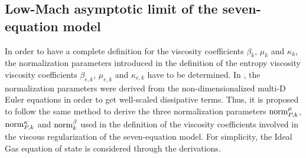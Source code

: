 \subsection{Low-Mach asymptotic limit of the seven-equation model}\label{sec:low-Mach-sem}
In order to have a complete definition for the viscosity coefficients $\beta_k$, $\mu_k$ and $\kappa_k$, the normalization parameters introduced in the definition of the entropy viscosity viscosity coefficients $\beta_{e,k}$, $\mu_{e,k}$ and $\kappa_{e,k}$ have to be determined. In , the normalization parameters were derived from the non-dimensionalized multi-D Euler equations in order to get well-scaled dissipative terms. Thus, it is proposed to follow the same method to derive the three normalization parameters $\textrm{norm}_{P,k}^\mu$, $\textrm{norm}_{P,k}^\kappa$ and $\textrm{norm}_{k}^\beta$ used in the definition of the viscosity coefficients involved in the viscous regularization of the seven-equation model. For simplicity, the Ideal Gas equation of state is considered through the derivations.

